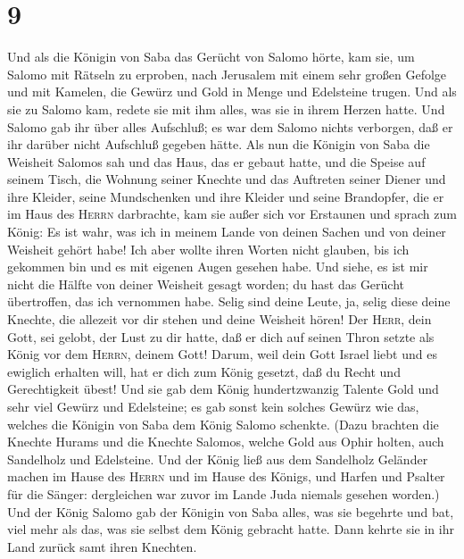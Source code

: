 \hypertarget{section-8}{%
\section{9}\label{section-8}}

 Und als die Königin von Saba das Gerücht von Salomo
hörte, kam sie, um Salomo mit Rätseln zu erproben, nach Jerusalem mit
einem sehr großen Gefolge und mit Kamelen, die Gewürz und Gold in Menge
und Edelsteine trugen. Und als sie zu Salomo kam, redete sie mit ihm
alles, was sie in ihrem Herzen hatte.  Und Salomo gab ihr
über alles Aufschluß; es war dem Salomo nichts verborgen, daß er ihr
darüber nicht Aufschluß gegeben hätte.  Als nun die
Königin von Saba die Weisheit Salomos sah und das Haus, das er gebaut
hatte,  und die Speise auf seinem Tisch, die Wohnung
seiner Knechte und das Auftreten seiner Diener und ihre Kleider, seine
Mundschenken und ihre Kleider und seine Brandopfer, die er im Haus des
\textsc{Herrn} darbrachte, kam sie außer sich vor Erstaunen
 und sprach zum König: Es ist wahr, was ich in meinem
Lande von deinen Sachen und von deiner Weisheit gehört habe!
 Ich aber wollte ihren Worten nicht glauben, bis ich
gekommen bin und es mit eigenen Augen gesehen habe. Und siehe, es ist
mir nicht die Hälfte von deiner Weisheit gesagt worden; du hast das
Gerücht übertroffen, das ich vernommen habe.  Selig sind
deine Leute, ja, selig diese deine Knechte, die allezeit vor dir stehen
und deine Weisheit hören!  Der \textsc{Herr}, dein Gott,
sei gelobt, der Lust zu dir hatte, daß er dich auf seinen Thron setzte
als König vor dem \textsc{Herrn}, deinem Gott! Darum, weil dein Gott
Israel liebt und es ewiglich erhalten will, hat er dich zum König
gesetzt, daß du Recht und Gerechtigkeit übest!  Und sie
gab dem König hundertzwanzig Talente Gold und sehr viel Gewürz und
Edelsteine; es gab sonst kein solches Gewürz wie das, welches die
Königin von Saba dem König Salomo schenkte.  (Dazu
brachten die Knechte Hurams und die Knechte Salomos, welche Gold aus
Ophir holten, auch Sandelholz und Edelsteine.  Und der
König ließ aus dem Sandelholz Geländer machen im Hause des
\textsc{Herrn} und im Hause des Königs, und Harfen und Psalter für die
Sänger: dergleichen war zuvor im Lande Juda niemals gesehen worden.)
 Und der König Salomo gab der Königin von Saba alles, was
sie begehrte und bat, viel mehr als das, was sie selbst dem König
gebracht hatte. Dann kehrte sie in ihr Land zurück samt ihren Knechten.
